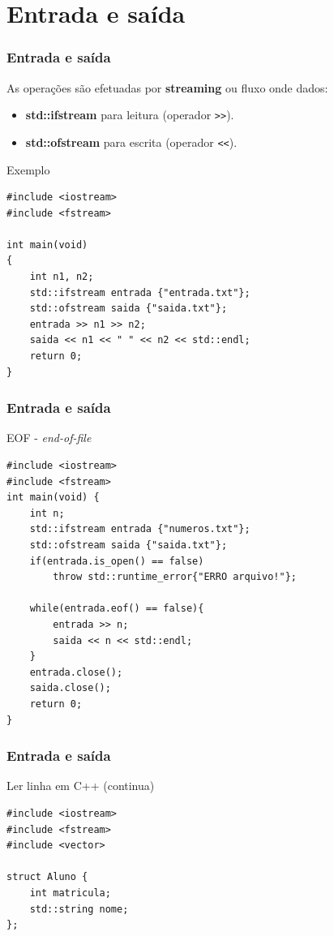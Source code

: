 \documentclass[xcolor={usenames,dvipsnames},10pt,compress,aspectratio=169]{beamer}
\begin{document}
\section{Entrada e saída}
\begin{frame}[fragile]
  \frametitle{Entrada e saída}
As operações são efetuadas por \textbf{streaming} ou fluxo onde dados:
\begin{itemize}
\item \textbf{std::ifstream} para leitura (operador \verb+>>+).
\item \textbf{std::ofstream} para escrita (operador \verb+<<+).
\end{itemize}
  \begin{block}{Exemplo}
\begin{lstlisting}
#include <iostream>
#include <fstream>

int main(void)
{
    int n1, n2;
    std::ifstream entrada {"entrada.txt"};
    std::ofstream saida {"saida.txt"};
    entrada >> n1 >> n2;
    saida << n1 << " " << n2 << std::endl;
    return 0;
}
\end{lstlisting}
  \end{block}
\end{frame}
\begin{frame}[fragile]
  \frametitle{Entrada e saída}
  \begin{block}{EOF - \emph{end-of-file}}
\begin{lstlisting}
#include <iostream>
#include <fstream>
int main(void) {
    int n;
    std::ifstream entrada {"numeros.txt"};
    std::ofstream saida {"saida.txt"};
    if(entrada.is_open() == false)
        throw std::runtime_error{"ERRO arquivo!"};

    while(entrada.eof() == false){
        entrada >> n;
        saida << n << std::endl;
    }
    entrada.close();
    saida.close();
    return 0;
}
\end{lstlisting}
  \end{block}
\end{frame}
\begin{frame}[fragile]
  \frametitle{Entrada e saída}
  \begin{block}{Ler linha em C++ (continua)}
\begin{lstlisting}
#include <iostream>
#include <fstream>
#include <vector>

struct Aluno {
    int matricula;
    std::string nome;
};
\end{lstlisting}
  \end{block}
\end{frame}
\end{document}
